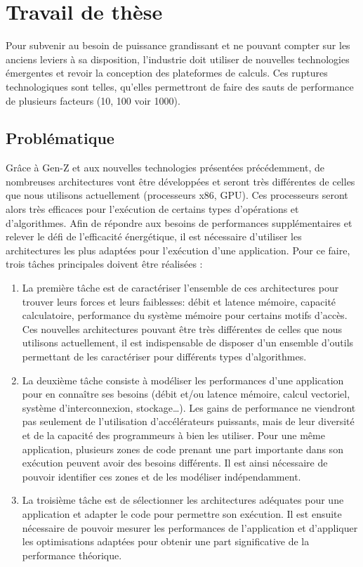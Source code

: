 \section{Travail de thèse}

    
    Pour subvenir au besoin de puissance grandissant et ne pouvant compter sur les anciens leviers à sa disposition, l'industrie doit utiliser de nouvelles technologies émergentes et revoir la conception des plateformes de calculs. Ces ruptures technologiques sont telles, qu'elles permettront de faire des sauts de performance de plusieurs facteurs (10, 100 voir 1000).

    
    \subsection{Problématique}
    
        Grâce à Gen-Z et aux nouvelles technologies présentées précédemment, de nombreuses architectures vont être développées et seront très différentes de celles que nous utilisons actuellement (processeurs x86, GPU). Ces processeurs seront alors très efficaces pour l'exécution de certains types d'opérations et d'algorithmes. Afin de répondre aux besoins de performances supplémentaires et relever le défi de l'efficacité énergétique, il est nécessaire d'utiliser les architectures les plus adaptées pour l'exécution d'une application. Pour ce faire, trois tâches principales doivent être réalisées :
        \begin{enumerate}
            \item La première tâche est de caractériser l'ensemble de ces architectures pour trouver leurs forces et leurs faiblesses: débit et latence mémoire, capacité calculatoire, performance du système mémoire pour certains motifs d'accès. Ces nouvelles architectures pouvant être très différentes de celles que nous utilisons actuellement, il est indispensable de disposer d'un ensemble d'outils permettant de les caractériser pour différents types d'algorithmes.
        
            \item La deuxième tâche consiste à modéliser les performances d'une application pour en connaître ses besoins (débit et/ou latence mémoire, calcul vectoriel, système d'interconnexion, stockage…). Les gains de performance ne viendront pas seulement de l'utilisation d'accélérateurs puissants, mais de leur diversité et de la capacité des programmeurs à bien les utiliser. Pour une même application, plusieurs zones de code prenant une part importante dans son exécution peuvent avoir des besoins différents. Il est ainsi nécessaire de pouvoir identifier ces zones et de les modéliser indépendamment. 
        
            \item La troisième tâche est de sélectionner les architectures adéquates pour une application et adapter le code pour permettre son exécution. Il est ensuite nécessaire de pouvoir mesurer les performances de l'application et d'appliquer les optimisations adaptées pour obtenir une part significative de la performance théorique.
        \end{enumerate}
    
